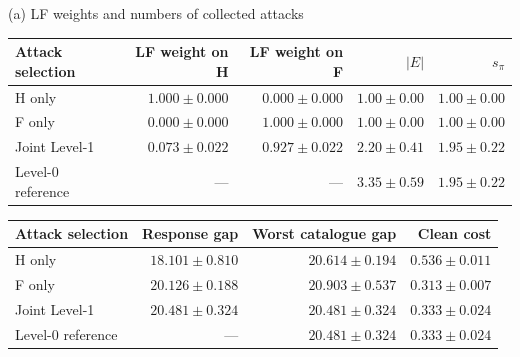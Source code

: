 {(a) LF weights and numbers of collected attacks}\par\smallskip
\begin{tabular}{@{}lrrrr@{}}
\toprule
Attack selection & LF weight on H & LF weight on F & $|E|$ & $s_\pi$\\
\midrule
H only & $1.000\pm0.000$ & $0.000\pm0.000$ & $1.00\pm0.00$ & $1.00\pm0.00$\\
F only & $0.000\pm0.000$ & $1.000\pm0.000$ & $1.00\pm0.00$ & $1.00\pm0.00$\\
Joint Level-1 & $0.073\pm0.022$ & $0.927\pm0.022$ & $2.20\pm0.41$ & $1.95\pm0.22$\\
Level-0 reference & --- & --- & $3.35\pm0.59$ & $1.95\pm0.22$\\
\bottomrule\end{tabular}

\par\smallskip
\begin{tabular}{@{}lrrr@{}}
\toprule
Attack selection & Response gap & Worst catalogue gap & Clean cost\\
\midrule
H only & $18.101\pm0.810$ & $20.614\pm0.194$ & $0.536\pm0.011$\\
F only & $20.126\pm0.188$ & $20.903\pm0.537$ & $0.313\pm0.007$\\
Joint Level-1 & $20.481\pm0.324$ & $20.481\pm0.324$ & $0.333\pm0.024$\\
Level-0 reference & --- & $20.481\pm0.324$ & $0.333\pm0.024$\\
\bottomrule\end{tabular}
